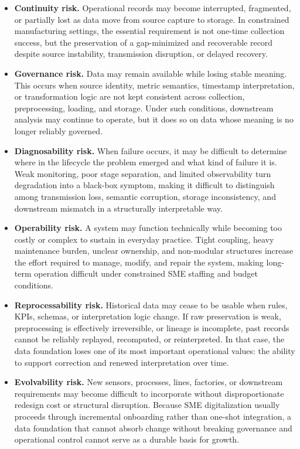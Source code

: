 \documentclass[systems,article,submit,pdftex,moreauthors]{Definitions/mdpi}
\begin{document}
\begin{itemize}[leftmargin=1.5em]
    \item[\textbf{RSK1.}] \textbf{Continuity risk.} Operational records may become interrupted, fragmented, or partially lost as data move from source capture to storage. In constrained manufacturing settings, the essential requirement is not one-time collection success, but the preservation of a gap-minimized and recoverable record despite source instability, transmission disruption, or delayed recovery.

    \item[\textbf{RSK2.}] \textbf{Governance risk.} Data may remain available while losing stable meaning. This occurs when source identity, metric semantics, timestamp interpretation, or transformation logic are not kept consistent across collection, preprocessing, loading, and storage. Under such conditions, downstream analysis may continue to operate, but it does so on data whose meaning is no longer reliably governed.

    \item[\textbf{RSK3.}] \textbf{Diagnosability risk.} When failure occurs, it may be difficult to determine where in the lifecycle the problem emerged and what kind of failure it is. Weak monitoring, poor stage separation, and limited observability turn degradation into a black-box symptom, making it difficult to distinguish among transmission loss, semantic corruption, storage inconsistency, and downstream mismatch in a structurally interpretable way.

    \item[\textbf{RSK4.}] \textbf{Operability risk.} A system may function technically while becoming too costly or complex to sustain in everyday practice. Tight coupling, heavy maintenance burden, unclear ownership, and non-modular structures increase the effort required to manage, modify, and repair the system, making long-term operation difficult under constrained SME staffing and budget conditions.

    \item[\textbf{RSK5.}] \textbf{Reprocessability risk.} Historical data may cease to be usable when rules, KPIs, schemas, or interpretation logic change. If raw preservation is weak, preprocessing is effectively irreversible, or lineage is incomplete, past records cannot be reliably replayed, recomputed, or reinterpreted. In that case, the data foundation loses one of its most important operational values: the ability to support correction and renewed interpretation over time.

    \item[\textbf{RSK6.}] \textbf{Evolvability risk.} New sensors, processes, lines, factories, or downstream requirements may become difficult to incorporate without disproportionate redesign cost or structural disruption. Because SME digitalization usually proceeds through incremental onboarding rather than one-shot integration, a data foundation that cannot absorb change without breaking governance and operational control cannot serve as a durable basis for growth.
\end{itemize}
\end{document}

